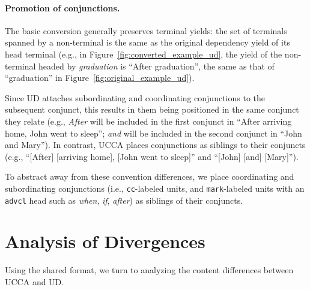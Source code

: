 \documentclass[11pt,a4paper,table]{article}
\begin{document}
\paragraph{Promotion of conjunctions.}
The basic conversion generally preserves terminal yields:
the set of terminals spanned by a non-terminal is the same
as the original dependency yield of its head terminal
(e.g., in Figure~\ref{fig:converted_example_ud}, the yield of the non-terminal
headed by \textit{graduation} is ``After graduation'', the same as that of ``graduation''
in Figure~\ref{fig:original_example_ud}).

Since UD attaches subordinating and coordinating conjunctions to the subsequent conjunct,
this results in them being positioned in the same conjunct they relate (e.g.,
\textit{After} will be included in the first conjunct in ``After arriving home, John went to sleep'';
\textit{and} will be included in the second conjunct in ``John and Mary'').
In contrast, UCCA places conjunctions as siblings to their conjuncts (e.g.,
``[After] [arriving home], [John went to sleep]'' and ``[John] [and] [Mary]''). 

To abstract away from these convention differences,
we place 
coordinating and subordinating conjunctions 
(i.e., \texttt{cc}-labeled units, and \texttt{mark}-labeled units with an \texttt{advcl} head such 
as \textit{when}, \textit{if}, \textit{after}) as siblings of their conjuncts.


\section{Analysis of Divergences}\label{sec:analysis}

Using the shared format,
we turn to analyzing the content differences between UCCA and UD.
\end{document}
